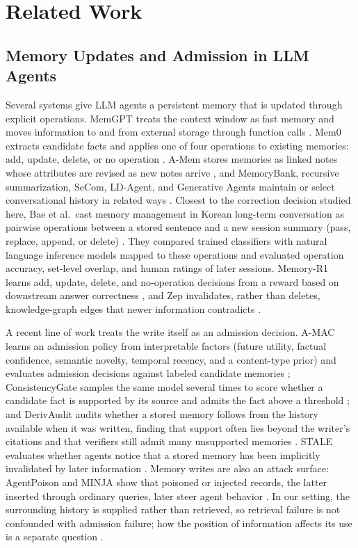 \documentclass[acmsmall,review]{acmart}
\begin{document}
\section{Related Work}\label{sec:related}
\subsection{Memory Updates and Admission in LLM Agents}
Several systems give LLM agents a persistent memory that is updated through explicit operations. MemGPT treats the context window as fast memory and moves information to and from external storage through function calls \cite{cite21}. Mem0 extracts candidate facts and applies one of four operations to existing memories: add, update, delete, or no operation \cite{cite6}. A-Mem stores memories as linked notes whose attributes are revised as new notes arrive \cite{cite39}, and MemoryBank, recursive summarization, SeCom, LD-Agent, and Generative Agents maintain or select conversational history in related ways \cite{cite15,cite22,cite23,cite35,cite47}. Closest to the correction decision studied here, Bae et al.\ cast memory management in Korean long-term conversation as pairwise operations between a stored sentence and a new session summary (pass, replace, append, or delete) \cite{cite4}. They compared trained classifiers with natural language inference models mapped to these operations and evaluated operation accuracy, set-level overlap, and human ratings of later sessions. Memory-R1 learns add, update, delete, and no-operation decisions from a reward based on downstream answer correctness \cite{cite40}, and Zep invalidates, rather than deletes, knowledge-graph edges that newer information contradicts \cite{cite26}.

A recent line of work treats the write itself as an admission decision. A-MAC learns an admission policy from interpretable factors (future utility, factual confidence, semantic novelty, temporal recency, and a content-type prior) and evaluates admission decisions against labeled candidate memories \cite{cite48}; ConsistencyGate samples the same model several times to score whether a candidate fact is supported by its source and admits the fact above a threshold \cite{cite49}; and DerivAudit audits whether a stored memory follows from the history available when it was written, finding that support often lies beyond the writer's citations and that verifiers still admit many unsupported memories \cite{cite51}. STALE evaluates whether agents notice that a stored memory has been implicitly invalidated by later information \cite{cite50}. Memory writes are also an attack surface: AgentPoison and MINJA show that poisoned or injected records, the latter inserted through ordinary queries, later steer agent behavior \cite{cite5,cite7}. In our setting, the surrounding history is supplied rather than retrieved, so retrieval failure is not confounded with admission failure; how the position of information affects its use is a separate question \cite{cite16}.
\end{document}
